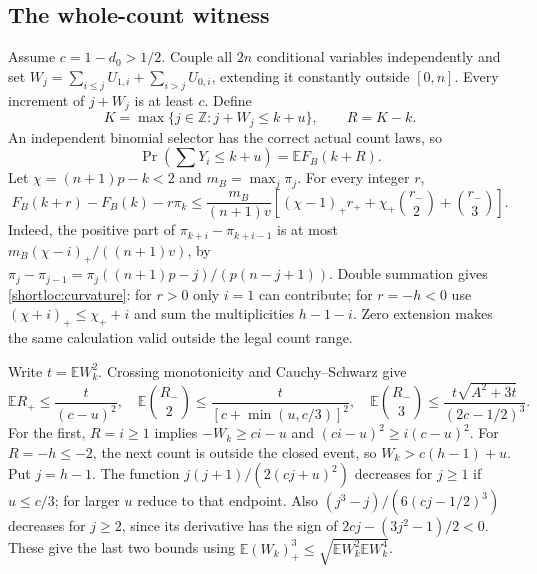 \subsection{The whole-count witness}

Assume $c=1-d_0>1/2$. Couple all $2n$ conditional variables independently and
set $W_j=\sum_{i\le j}U_{1,i}+\sum_{i>j}U_{0,i}$, extending it constantly
outside $[0,n]$. Every increment of $j+W_j$ is at least $c$. Define
\[
 K=\max\{j\in\mathbb Z:j+W_j\le k+u\},\qquad R=K-k.
\]
An independent binomial selector has the correct actual count laws, so
\begin{equation}\label{shortloc:cutoff}
                  \Pr(\textstyle\sum Y_i\le k+u)=\mathbb EF_B(k+R).
\end{equation}
Let $\chi=(n+1)p-k<2$ and $m_B=\max_j\pi_j$. For every integer $r$,
\begin{equation}\label{shortloc:curvature}
 F_B(k+r)-F_B(k)-r\pi_k\le\frac{m_B}{(n+1)v}
 \left[(\chi-1)_+r_++\chi_+\binom{r_-}{2}+\binom{r_-}{3}\right].
\end{equation}
Indeed, the positive part of $\pi_{k+i}-\pi_{k+i-1}$ is at most
$m_B(\chi-i)_+/((n+1)v)$, by
$\pi_j-\pi_{j-1}=\pi_j((n+1)p-j)/(p(n-j+1))$.
Double summation gives \eqref{shortloc:curvature}: for $r>0$ only $i=1$
can contribute; for $r=-h<0$ use $(\chi+i)_+\le\chi_++i$ and sum the
multiplicities $h-1-i$. Zero extension makes the same calculation valid
outside the legal count range.

Write $t=\mathbb EW_k^2$. Crossing monotonicity and Cauchy--Schwarz give
\begin{equation}\label{shortloc:crossingmoments}
 \mathbb ER_+\le\frac{t}{(c-u)^2},\quad
 \mathbb E\binom{R_-}{2}\le\frac{t}{[c+\min(u,c/3)]^2},\quad
 \mathbb E\binom{R_-}{3}\le\frac{t\sqrt{A^2+3t}}{(2c-1/2)^3}.
\end{equation}
For the first, $R=i\ge1$ implies $-W_k\ge ci-u$ and
$(ci-u)^2\ge i(c-u)^2$. For $R=-h\le-2$, the next count is outside the
closed event, so $W_k>c(h-1)+u$. Put $j=h-1$.
The function $j(j+1)/(2(cj+u)^2)$ decreases for $j\ge1$ if $u\le c/3$;
for larger $u$ reduce to that endpoint. Also
$(j^3-j)/(6(cj-1/2)^3)$ decreases for $j\ge2$, since its derivative has
the sign of $2cj-(3j^2-1)/2<0$. These give the last two bounds using
$\mathbb E(W_k)_+^3\le\sqrt{\mathbb EW_k^2\mathbb EW_k^4}$.

